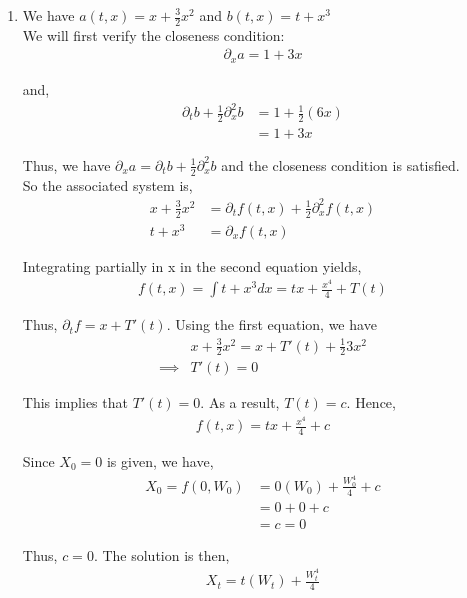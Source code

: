 \documentclass[12pt]{article}
\begin{document}
\begin{enumerate}[\alph*)]

\item We have $a(t,x) = x + \frac{3}{2} x^2$ and $b(t,x) = t + x^3$\\

We will first verify the closeness condition:
\begin{align*}
\partial_x a = 1 + 3x
\end{align*}

and,
\begin{align*}
\partial_t b + \frac{1}{2} \partial_x^2 b &= 1 + \frac{1}{2}(6x)\\
&= 1 + 3x
\end{align*}

Thus, we have $\partial_x a = \partial_t b + \frac{1}{2} \partial_x^2 b$ and the closeness condition is satisfied.\\

So the associated system is,
\begin{align*}
x + \frac{3}{2} x^2 &= \partial_t f(t,x) + \frac{1}{2} \partial_x^2 f(t,x)\\
t + x^3 &= \partial_x f(t,x)
\end{align*}

Integrating partially in x in the second equation yields,
\begin{align*}
f(t,x) = \int t + x^3 dx = tx + \frac{x^4}{4} + T(t)
\end{align*}

Thus, $\partial_t f = x + T'(t)$. Using the first equation, we have
\begin{align*}
&x + \frac{3}{2} x^2 = x + T'(t) + \frac{1}{2}3x^2\\
\implies &T'(t) = 0
\end{align*}

This implies that $T'(t) = 0$. As a result, $T(t) = c$. Hence,
\begin{align*}
f(t,x) = tx + \frac{x^4}{4} + c
\end{align*}

Since $X_0 = 0$ is given, we have,
\begin{align*}
X_0 = f(0, W_0) &= 0(W_0) + \frac{W_0^4}{4} + c\\
&= 0 + 0 + c\\
&= c = 0
\end{align*}

Thus, $c = 0$. The solution is then,
\begin{align*}
X_t = t(W_t) + \frac{W_t^4}{4}
\end{align*}


\end{enumerate}
\end{document}
